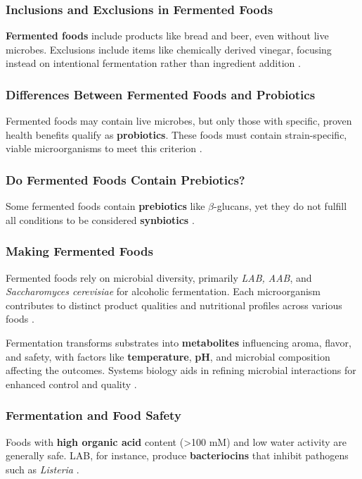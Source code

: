 \subsubsection*{Inclusions and Exclusions in Fermented Foods}
\textbf{Fermented foods} include products like bread and beer, even without live microbes. Exclusions include items like chemically derived vinegar, focusing instead on intentional fermentation rather than ingredient addition \cite*{L9-ISAPP}.

\subsubsection*{Differences Between Fermented Foods and Probiotics}
Fermented foods may contain live microbes, but only those with specific, proven health benefits qualify as \textbf{probiotics}. These foods must contain strain-specific, viable microorganisms to meet this criterion \cite*{L9-ISAPP}.

\subsubsection*{Do Fermented Foods Contain Prebiotics?}
Some fermented foods contain \textbf{prebiotics} like $\beta$-glucans, yet they do not fulfill all conditions to be considered \textbf{synbiotics} \cite*{L9-ISAPP}.

\subsubsection{Making Fermented Foods}
Fermented foods rely on microbial diversity, primarily \textit{LAB, AAB}, and \textit{Saccharomyces cerevisiae} for alcoholic fermentation. Each microorganism contributes to distinct product qualities and nutritional profiles across various foods \cite*{L9-ISAPP}.

Fermentation transforms substrates into \textbf{metabolites} influencing aroma, flavor, and safety, with factors like \textbf{temperature}, \textbf{pH}, and microbial composition affecting the outcomes. Systems biology aids in refining microbial interactions for enhanced control and quality \cite*{L9-ISAPP}.

\subsubsection{Fermentation and Food Safety}
Foods with \textbf{high organic acid} content (>100 mM) and low water activity are generally safe. LAB, for instance, produce \textbf{bacteriocins} that inhibit pathogens such as \textit{Listeria} \cite*{L9-ISAPP}.

